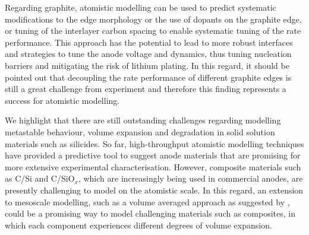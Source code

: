 \documentclass[../main.tex]{subfiles}
\begin{document}
Regarding graphite, atomistic modelling can be used to predict systematic modifications to the edge morphology or the use of dopants on the graphite edge, \cite{peng2020lithium,weydanz1994behavior,way1994effect} or tuning of the interlayer carbon spacing\cite{JI201866} to enable systematic tuning of the rate performance. This approach has the potential to lead to more robust interfaces and strategies to tune the anode voltage and dynamics, thus tuning nucleation barriers and mitigating the risk of lithium plating.\cite{peng2021} In this regard, it should be pointed out that decoupling the rate performance of different graphite edges is still a great challenge from experiment and therefore this finding represents a success for atomistic modelling.

We highlight that there are still outstanding challenges regarding modelling metastable behaviour, volume expansion and degradation in solid solution materials such as silicides. So far, high-throughput atomistic modelling techniques have provided a predictive tool to suggest anode materials that are promising for more extensive experimental characterisation. However, composite materials such as C/Si and C/SiO$_x$, which are increasingly being used in commercial anodes, are presently challenging to model on the atomistic scale. In this regard, an extension to mesoscale modelling, such as a volume averaged approach as suggested by \citeauthor{franco2019}, could be a promising way to model challenging materials such as composites, in which each component experiences different degrees of volume expansion.\cite{franco2019}
\end{document}
